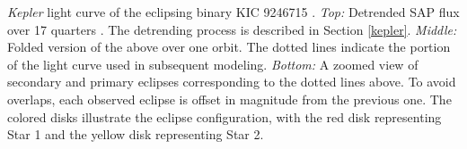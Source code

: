 \label{fig:keplerfig} \emph{Kepler} light curve of the eclipsing binary KIC 9246715 . \emph{Top:} Detrended SAP flux over 17 quarters . The detrending process is described in Section \ref{kepler}. \emph{Middle:} Folded version of the above over one orbit. The dotted lines indicate the portion of the light curve used in subsequent modeling. \emph{Bottom:} A zoomed view of secondary and primary eclipses corresponding to the dotted lines above. To avoid overlaps, each observed eclipse is offset in magnitude from the previous one. The colored disks illustrate the eclipse configuration, with the red disk representing Star 1 and the yellow disk representing Star 2.
